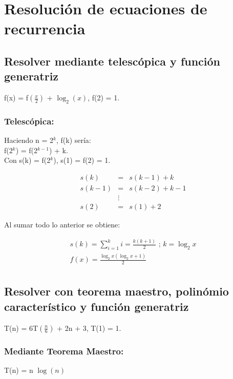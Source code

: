 \section{Resolución de ecuaciones de recurrencia}
\subsection{Resolver mediante telescópica y función generatriz}
	\begin{center}
		f(x) = f$\left(\frac{x}{2}\right)$ + $\log_{2}(x)$, f(2) = 1.
	\end{center}
	\subsubsection{Telescópica:}
		\begin{center}	
			Haciendo n = 2$^{k}$, f(k) sería:\\
			f(2$^k$) = f(2$^{k-1}$) + k.\\
			Con s(k) = f(2$^{k}$), s(1) = f(2) = 1.
		\end{center}
		\begin{eqnarray*}
			s(k) &=& s(k-1) + k\\
			s(k-1) &=& s(k-2) + k-1\\
			&\vdots & \\
			s(2) &=& s(1) +2
		\end{eqnarray*}		
		\begin{center}
			Al sumar todo lo anterior se obtiene:\\
		\end{center}					
		\begin{eqnarray*}
			s(k) = \sum_{i=1}^{k} i = \frac{k(k+1)}{2} \text{ ; } k = \log_2 x\\
			f(x) = \frac{\log_2 x (\log_2 x + 1)}{2} \\
		\end{eqnarray*}

\subsection{Resolver con teorema maestro, polinómio característico y función generatriz}
	\begin{center}
		T(n) = 6T$\left(\frac{n}{6}\right)$ + 2n + 3, T(1) = 1.
	\end{center}
	\subsubsection{Mediante Teorema Maestro:}
		\begin{center}
			T(n) = n $\log{}(n)$
		\end{center}
